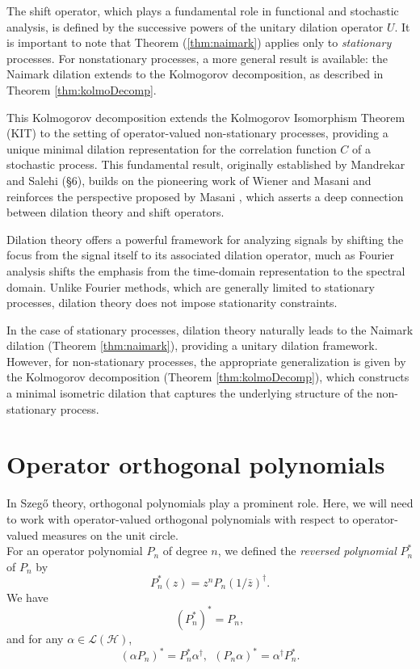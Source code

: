 \documentclass[11pt]{article}
\begin{document}
The shift operator, which plays a fundamental role in functional and stochastic analysis, is defined by the successive powers of the unitary dilation operator \( U \). It is important to note that Theorem (\ref{thm:naimark}) applies only to \textit{stationary} processes. For nonstationary processes, a more general result is available: the Naimark dilation extends to the Kolmogorov decomposition, as described in Theorem \ref{thm:kolmoDecomp}.

This Kolmogorov decomposition extends the Kolmogorov Isomorphism Theorem (KIT) \cite{Kol} to the setting of operator-valued non-stationary processes, providing a unique minimal dilation representation for the correlation function \( C \) of a stochastic process. This fundamental result, originally established by Mandrekar and Salehi \cite{ManS} (\S 6), builds on the pioneering work of Wiener and Masani \cite{WieM} and reinforces the perspective proposed by Masani \cite{Mas2}, which asserts a deep connection between dilation theory and shift operators.

Dilation theory offers a powerful framework for analyzing signals by shifting the focus from the signal itself to its associated dilation operator, much as Fourier analysis shifts the emphasis from the time-domain representation to the spectral domain. Unlike Fourier methods, which are generally limited to stationary processes, dilation theory does not impose stationarity constraints. 

In the case of stationary processes, dilation theory naturally leads to the Naimark dilation (Theorem \ref{thm:naimark}), providing a unitary dilation framework. However, for non-stationary processes, the appropriate generalization is given by the Kolmogorov decomposition (Theorem \ref{thm:kolmoDecomp}), which constructs a minimal isometric dilation that captures the underlying structure of the non-stationary process.



\section{Operator orthogonal polynomials}

In Szeg\H{o} theory, orthogonal polynomials play a prominent role. Here, we will need to work with operator-valued orthogonal polynomials with respect to operator-valued measures on the unit circle. \\

For an operator polynomial $P_{n}$ of degree $n$, we defined the \textit{reversed polynomial} $P_{n}^{*}$  of $P_{n}$ by $$
P^{*}_{n}(z)=z^{n}P_{n}(1/\bar{z})^{\dag}.
$$
\noindent We have $$(P^{*}_{n})^{*}= P_{n},$$ and for any $\alpha\in \mathcal{L}(\mathcal{H})$, $$(\alpha P_{n})^{*} = P_{n}^{*}\alpha^{\dag},~~(P_{n}\alpha )^{*} = \alpha^{\dag}P_{n}^{*}.$$
\end{document}
